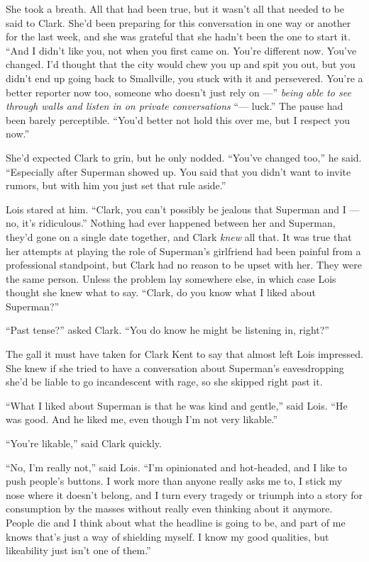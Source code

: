 She took a breath. All that had been true, but it wasn't all that needed
to be said to Clark. She'd been preparing for this conversation in one
way or another for the last week, and she was grateful that she hadn't
been the one to start it. ``And I didn't like you, not when you first
came on. You're different now. You've changed. I'd thought that the city
would chew you up and spit you out, but you didn't end up going back to
Smallville, you stuck with it and persevered. You're a better reporter
now too, someone who doesn't just rely on ---'' \emph{being able to see
through walls and listen in on private conversations} ``--- luck.'' The
pause had been barely perceptible. ``You'd better not hold this over me,
but I respect you now.''

She'd expected Clark to grin, but he only nodded. ``You've changed
too,'' he said. ``Especially after Superman showed up. You said that you
didn't want to invite rumors, but with him you just set that rule
aside.''

Lois stared at him. ``Clark, you can't possibly be jealous that Superman
and I --- no, it's ridiculous.'' Nothing had ever happened between her
and Superman, they'd gone on a single date together, and Clark
\emph{knew} all that. It was true that her attempts at playing the role
of Superman's girlfriend had been painful from a professional
standpoint, but Clark had no reason to be upset with her. They were the
same person. Unless the problem lay somewhere else, in which case Lois
thought she knew what to say. ``Clark, do you know what I liked about
Superman?''

``Past tense?'' asked Clark. ``You do know he might be listening in,
right?''

The gall it must have taken for Clark Kent to say that almost left Lois
impressed. She knew if she tried to have a conversation about Superman's
eavesdropping she'd be liable to go incandescent with rage, so she
skipped right past it.

``What I liked about Superman is that he was kind and gentle,'' said
Lois. ``He was good. And he liked me, even though I'm not very
likable.''

``You're likable,'' said Clark quickly.

``No, I'm really not,'' said Lois. ``I'm opinionated and hot‐headed, and
I like to push people's buttons. I work more than anyone really asks me
to, I stick my nose where it doesn't belong, and I turn every tragedy or
triumph into a story for consumption by the masses without really even
thinking about it anymore. People die and I think about what the
headline is going to be, and part of me knows that's just a way of
shielding myself. I know my good qualities, but likeability just isn't
one of them.''

